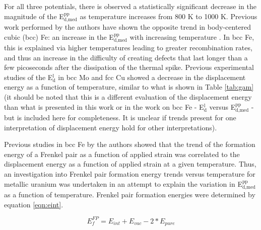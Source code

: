 \documentclass[review]{elsarticle}
\begin{document}
\FloatBarrier

For all three potentials, there is observed a statistically significant decrease in the magnitude of the E$^{\textrm{pp}}_{\textrm{d,med}}$ as temperature increases from 800 K to 1000 K. Previous work performed by the authors have shown the opposite trend in body-centered cubic (bcc) Fe: an increase in the E$^{\textrm{pp}}_{\textrm{d,med}}$ with increasing temperature \cite{beeler2016}. In bcc Fe, this is explained via higher temperatures leading to greater recombination rates, and thus an increase in the difficulty of creating defects that last longer than a few picoseconds after the dissipation of the thermal spike. Previous experimental studies of the E$^{\textrm{l}}_{\textrm{d}}$ in bcc Mo \cite{zag1983} and fcc Cu\cite{yoshida1979} showed a decrease in the displacement energy as a function of temperature, similar to what is shown in Table \ref{tab:gam} (it should be noted that this is a different evaluation of the displacement energy than what is presented in this work or in the work on bcc Fe - E$^{\textrm{l}}_{\textrm{d}}$ versus E$^{\textrm{pp}}_{\textrm{d,med}}$ - but is included here for completeness. It is unclear if trends present for one interpretation of displacement energy hold for other interpretations). 

Previous studies in bcc Fe \cite{beeler2015, beeler2016} by the authors showed that the trend of the formation energy of a Frenkel pair as a function of applied strain was correlated to the displacement energy as a function of applied strain at a given temperature. Thus, an investigation into Frenkel pair formation energy trends versus temperature for metallic uranium was undertaken in an attempt to explain the variation in E$^{\textrm{pp}}_{\textrm{d,med}}$ as a function of temperature. Frenkel pair formation energies were determined by equation \ref{eqn:eint}.

\begin{equation}
\label{eqn:eint}
E_{f}^{FP} = E_{int} + E_{vac} - 2*E_{pure}
\end{equation} 
\end{document}
